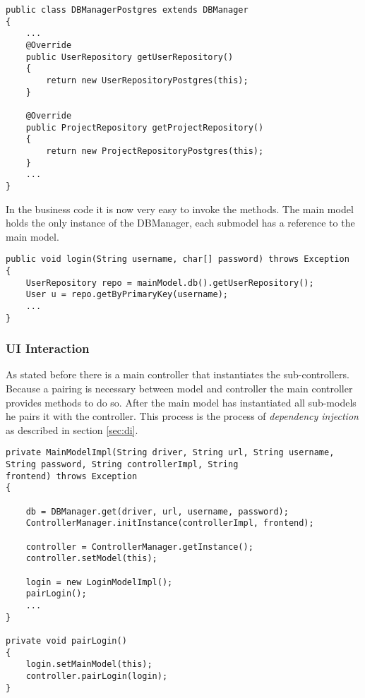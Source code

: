 \begin{lstlisting}[caption={Code snippet on how a DBManager implementation instantiates its repositories.}, captionpos=b]
public class DBManagerPostgres extends DBManager
{
	...
	@Override
	public UserRepository getUserRepository()
	{
		return new UserRepositoryPostgres(this);
	}
	
	@Override
	public ProjectRepository getProjectRepository()
	{
		return new ProjectRepositoryPostgres(this);
	}
	...
}
\end{lstlisting}

In the business code it is now very easy to invoke the methods. The main model holds the only instance of the DBManager, each submodel has a reference to the main model. 

\begin{lstlisting}[caption={Code snippet showing how repositories are used in business code. The main model holds the single instance of the DBManager. Each sub-model accesses it by using a getter-method.}, captionpos=b, label={lst:db-access-bp}]
public void login(String username, char[] password) throws Exception
{
	UserRepository repo = mainModel.db().getUserRepository();
	User u = repo.getByPrimaryKey(username);
	...
}
\end{lstlisting}

\subsubsection{UI Interaction}
As stated before there is a main controller that instantiates the sub-controllers. Because a pairing is necessary between model and controller the main controller provides methods to do so. After the main model has instantiated all sub-models he pairs it with the controller. This process is the process of \emph{dependency injection} as described in section \ref{sec:di}.

\begin{lstlisting}[caption={Code snippet showing initialization code for the controller. The main model retrieves the main controller by calling a getter which is similarily implemented as the DBManager class shown in listing \ref{lst:dbmanager}. After that he calls a method that pairs the sub-model with the sub-controller, a code snippet showing this process can be seen in listing \ref{lst:pairing}.}, captionpos=b]
private MainModelImpl(String driver, String url, String username, String password, String controllerImpl, String
frontend) throws Exception
{

	db = DBManager.get(driver, url, username, password);
	ControllerManager.initInstance(controllerImpl, frontend);
	
	controller = ControllerManager.getInstance();
	controller.setModel(this);
	
	login = new LoginModelImpl();
	pairLogin();
	...
}

private void pairLogin()
{
	login.setMainModel(this);
	controller.pairLogin(login);
}

\end{lstlisting}


